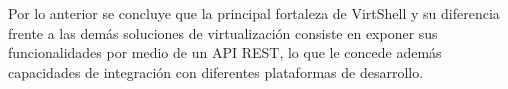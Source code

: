 \documentclass[conference, spanish]{IEEEtran}
\begin{document}
Por lo anterior se concluye que la principal fortaleza de VirtShell y su diferencia frente a
 las demás soluciones de virtualización consiste en exponer sus funcionalidades por medio de un API REST, lo que le concede además capacidades de integración con diferentes plataformas de desarrollo.














\end{document}
